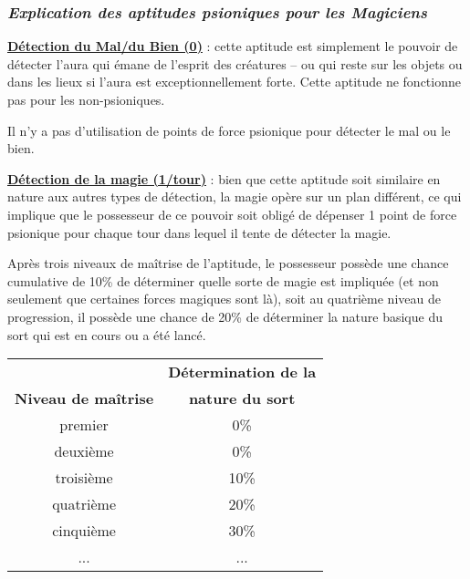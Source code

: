 \subsubsection*{\textit{Explication des aptitudes psioniques pour les Magiciens}}

\label{magicien-detection-mal}\textbf{\uline{Détection du Mal/du Bien (0)}} : cette aptitude est simplement le pouvoir de détecter l'aura qui émane de l'esprit des créatures -- ou qui reste sur les objets ou dans les lieux si l'aura est exceptionnellement forte. Cette aptitude ne fonctionne pas pour les non-psioniques.

\bigskip

Il n'y a pas d'utilisation de points de force psionique pour détecter le mal ou le bien.

\bigskip

\label{magicien-magie}\textbf{\uline{Détection de la magie (1/tour)}} : bien que cette aptitude soit similaire en nature aux autres types de détection, la magie opère sur un plan différent, ce qui implique que le possesseur de ce pouvoir soit obligé de dépenser 1 point de force psionique pour chaque tour dans lequel il tente de détecter la magie.

\bigskip

Après trois niveaux de maîtrise de l'aptitude, le possesseur possède une chance cumulative de 10\% de déterminer quelle sorte de magie est impliquée (et non seulement que certaines forces magiques sont là), soit au quatrième niveau de progression, il possède une chance de 20\% de déterminer la nature basique du sort qui est en cours ou a été lancé.

\bigskip

\begin{tabular}{cc}
                            &\textbf{Détermination de la} \\
\textbf{Niveau de maîtrise} & \textbf{nature du sort} \\
premier     & 0\%   \\
deuxième    & 0\%   \\
troisième   & 10\%  \\
quatrième   & 20\%  \\
cinquième   & 30\%  \\
...         & ...    \\
\end{tabular}

